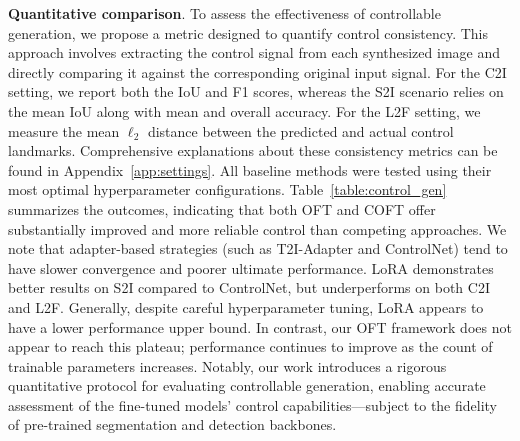 \textbf{Quantitative comparison}. To assess the effectiveness of controllable generation, we propose a metric designed to quantify control consistency. This approach involves extracting the control signal from each synthesized image and directly comparing it against the corresponding original input signal. For the C2I setting, we report both the IoU and F1 scores, whereas the S2I scenario relies on the mean IoU along with mean and overall accuracy. For the L2F setting, we measure the mean $\ell_2$ distance between the predicted and actual control landmarks. Comprehensive explanations about these consistency metrics can be found in Appendix~\ref{app:settings}. All baseline methods were tested using their most optimal hyperparameter configurations. Table~\ref{table:control_gen} summarizes the outcomes, indicating that both OFT and COFT offer substantially improved and more reliable control than competing approaches. We note that adapter-based strategies (such as T2I-Adapter and ControlNet) tend to have slower convergence and poorer ultimate performance. LoRA demonstrates better results on S2I compared to ControlNet, but underperforms on both C2I and L2F. Generally, despite careful hyperparameter tuning, LoRA appears to have a lower performance upper bound. In contrast, our OFT framework does not appear to reach this plateau; performance continues to improve as the count of trainable parameters increases. Notably, our work introduces a rigorous quantitative protocol for evaluating controllable generation, enabling accurate assessment of the fine-tuned models’ control capabilities—subject to the fidelity of pre-trained segmentation and detection backbones.


